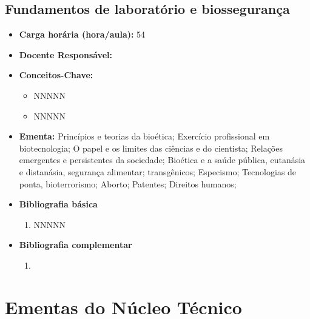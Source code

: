 \documentclass[11pt,fleqn]{book} %
\begin{document}
\subsection{Fundamentos de laboratório e biossegurança}\label{disc:laboratorio}
\begin{itemize}
	\item \textbf{Carga horária (hora/aula):} 54
	\item \textbf{Docente Responsável:}
	\item \textbf{Conceitos-Chave:}
	\begin{itemize}
		\item NNNNN
		\item NNNNN
	\end{itemize}
	\item \textbf{Ementa:} Princípios e teorias da bioética;
	Exercício profissional em biotecnologia; 
	O papel e os limites das ciências e do cientista; 
	Relações emergentes e persistentes da sociedade; 
	Bioética e a saúde pública, eutanásia e distanásia, segurança alimentar; transgênicos; 
	Especismo; 
	Tecnologias de ponta, bioterrorismo; 
	Aborto; 
	Patentes; 
	Direitos humanos;
	\item \textbf{Bibliografia básica}
	\begin{enumerate}
		\item NNNNN
	\end{enumerate}
	\item \textbf{Bibliografia complementar}
	\begin{enumerate}
		\item 
	\end{enumerate}	
\end{itemize}


\newpage
\section{Ementas do Núcleo Técnico}\label{ementasTecnico}


\newpage
\end{document}

